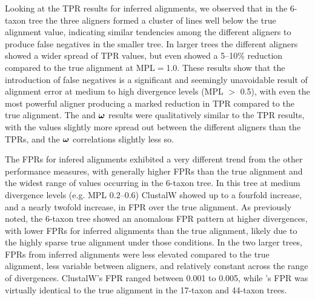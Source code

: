 \documentclass{mbe}
\begin{document}
Looking at the TPR results for inferred alignments, we observed that
in the 6-taxon tree the three aligners formed a cluster of lines well
below the true alignment value, indicating similar tendencies among
the different aligners to produce false negatives in the smaller
tree. In larger trees the different aligners showed a wider spread of
TPR values, but even \prankc{} showed a 5--10\% reduction compared to
the true alignment at MPL$=$1.0. These results show that the
introduction of false negatives is a significant and seemingly
unavoidable result of alignment error at medium to high divergence
levels (MPL $>$ 0.5), with even the most powerful aligner producing a
marked reduction in TPR compared to the true alignment. The \tpr and
$\bm{\omega}$ results were qualitatively similar to the TPR results, with the
\tpr values slightly more spread out between the different aligners
than the TPRs, and the $\bm{\omega}$ correlations slightly less so.

The FPRs for infered alignments exhibited a very different trend from
the other performance measures, with generally higher FPRs than the
true alignment and the widest range of values occurring in the 6-taxon
tree. In this tree at medium divergence levels (e.g. MPL 0.2--0.6)
ClustalW showed up to a fourfold increase, and \prankc{} a nearly
twofold increase, in FPR over the true alignment. As previously noted,
the 6-taxon tree showed an anomalous FPR pattern at higher
divergences, with lower FPRs for inferred alignments than the true
alignment, likely due to the highly sparse true alignment under those
conditions. In the two larger trees, FPRs from inferred alignments
were less elevated compared to the true alignment, less variable
between aligners, and relatively constant across the range of
divergences. ClustalW's FPR ranged between 0.001 to 0.005, while
\prankc{}'s FPR was virtually identical to the true alignment in the
17-taxon and 44-taxon trees.
\end{document}
